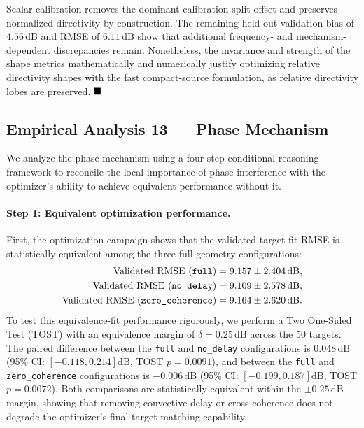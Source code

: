 \documentclass[11pt]{article}
\begin{document}
Scalar calibration removes the dominant calibration-split offset and preserves normalized directivity by construction. The remaining held-out validation bias of $4.56\,\mathrm{dB}$ and RMSE of $6.11\,\mathrm{dB}$ show that additional frequency- and mechanism-dependent discrepancies remain. Nonetheless, the invariance and strength of the shape metrics mathematically and numerically justify optimizing relative directivity shapes with the fast compact-source formulation, as relative directivity lobes are preserved. $\hfill \blacksquare$

\subsection{Empirical Analysis 13 --- Phase Mechanism}

We analyze the phase mechanism using a four-step conditional reasoning framework to reconcile the local importance of phase interference with the optimizer's ability to achieve equivalent performance without it.

\paragraph{Step 1: Equivalent optimization performance.}
First, the optimization campaign shows that the validated target-fit RMSE is statistically equivalent among the three full-geometry configurations:
\begin{align*}
    \text{Validated RMSE (\texttt{full})} &= 9.157 \pm 2.404\,\mathrm{dB}, \\
    \text{Validated RMSE (\texttt{no\_delay})} &= 9.109 \pm 2.578\,\mathrm{dB}, \\
    \text{Validated RMSE (\texttt{zero\_coherence})} &= 9.164 \pm 2.620\,\mathrm{dB}.
\end{align*}
To test this equivalence-fit performance rigorously, we perform a Two One-Sided Test (TOST) with an equivalence margin of $\delta = 0.25\,\mathrm{dB}$ across the 50 targets. The paired difference between the \texttt{full} and \texttt{no\_delay} configurations is $0.048\,\mathrm{dB}$ (95\% CI: $[-0.118, 0.214]\mathrm{dB}$, TOST $p = 0.0091$), and between the \texttt{full} and \texttt{zero\_coherence} configurations is $-0.006\,\mathrm{dB}$ (95\% CI: $[-0.199, 0.187]\mathrm{dB}$, TOST $p = 0.0072$). Both comparisons are statistically equivalent within the $\pm0.25\,\mathrm{dB}$ margin, showing that removing convective delay or cross-coherence does not degrade the optimizer's final target-matching capability.
\end{document}
